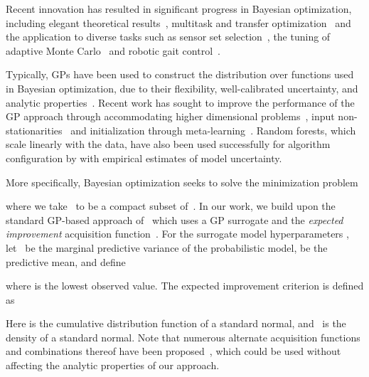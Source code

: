 \documentclass{article}
\begin{document}
Recent innovation has resulted in significant progress in Bayesian optimization, including elegant theoretical results~\cite{Srinivas2010,Bull2011,defreitas-etal-2013a}, multitask and transfer optimization~\cite{krause-ong-2011,swersky-etal-2013a,remi2013collab} and the application to diverse tasks such as sensor set selection~\cite{garnett-etal-2010}, the tuning of adaptive Monte Carlo~\cite{mahendran-2012a} and robotic gait control~\cite{calandra-etal-2014a}.

Typically, GPs have been used to construct the distribution over functions used in Bayesian optimization, due to their flexibility, well-calibrated uncertainty, and analytic properties~\cite{Jones2001,osborne-2009a}.  Recent work has sought to improve the performance of the GP approach through accommodating higher dimensional problems~\cite{wang-etal-2013,djolonga13high}, input non-stationarities~\cite{snoek-etal-2014a} and initialization through meta-learning~\cite{feurer-2015}.  Random forests, which scale linearly with the data, have also been used successfully for algorithm configuration by \citet{hutter-2011a} with empirical estimates of model uncertainty.

More specifically, Bayesian optimization seeks to solve the minimization problem

where we take~ to be a compact subset of~.  In our work, we build upon the standard GP-based approach of~\citet{Jones2001} which uses a GP surrogate and the \emph{expected improvement} acquisition function~\cite{Mockus1978}.
For the surrogate model hyperparameters , let~ be the marginal predictive variance of the probabilistic model,  be the predictive mean, and define

where  is the lowest observed value. The expected improvement criterion is defined as


Here  is the cumulative distribution function of a standard normal, and~ is the density of a standard normal. Note that numerous alternate acquisition functions and combinations thereof have been proposed~\cite{kushner-1964a,Srinivas2010,hoffman-etal-2011}, which could be used without affecting the analytic properties of our approach.
\end{document}
